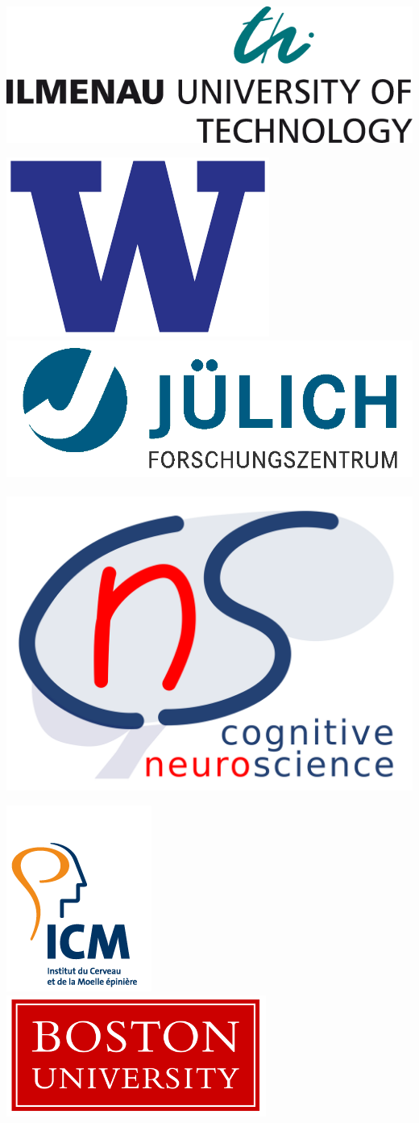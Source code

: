 \documentclass[t,11pt,compress]{beamer} %
\begin{document}
\begin{frame}[plain,t,c]
\begin{minipage}{0.15\linewidth}
{    \,
    \includegraphics[width=0.45\linewidth]{logo_tuil}
    }
    \centerline{%
    \includegraphics[width=0.24\linewidth]{logo_uw}
    \,
    \includegraphics[width=0.45\linewidth]{logo_fzj_cut}
    \,
    \includegraphics[width=0.21\linewidth]{logo_cns}
    }
    \centerline{%
    \includegraphics[width=0.25\linewidth]{logo_icm.png}
    \,
    \includegraphics[width=0.4\linewidth]{logo_bu.png}
    }

\end{minipage}

%


\end{frame}
\end{document}
